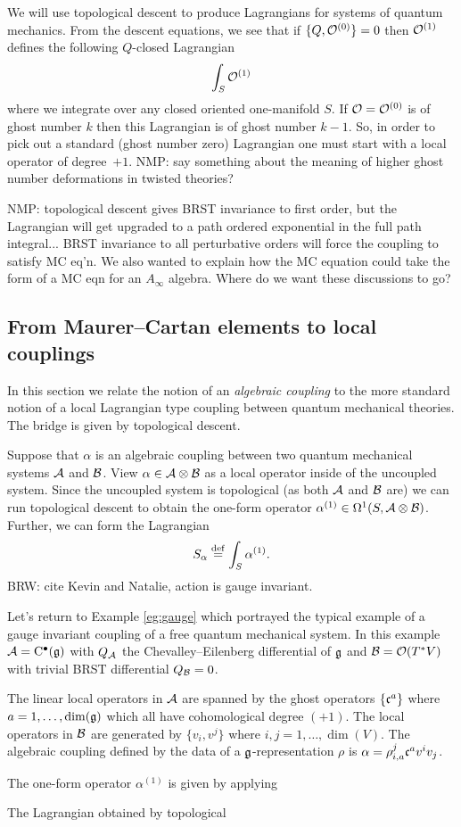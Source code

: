 \documentclass[11pt]{amsart}
\def\brian#1{{\textcolor{blue!65!red}{BRW: {#1}}}}
\def\natalie#1{{\textcolor{green!65!black}{NMP: {#1}}}}
\begin{document}
We will use topological descent to produce Lagrangians for systems of quantum mechanics. 
From the descent equations, we see that if $\{Q,\mathcal O^{(0)}\} = 0$ then $\mathcal O^{(1)}$ defines the following $Q$-closed Lagrangian
\[
\int_S \mathcal O^{(1)} 
\]
where we integrate over any closed oriented one-manifold $S$.
If $\mathcal O = \mathcal O^{(0)}$ is of ghost number $k$ then this Lagrangian is of ghost number $k-1$. 
So, in order to pick out a standard (ghost number zero) Lagrangian one must start with a local operator of degree~$+1$. \natalie{say something about the meaning of higher ghost number deformations in twisted theories?}

\natalie{topological descent gives BRST invariance to first order, but the Lagrangian will get upgraded to a path ordered exponential in the full path integral... BRST invariance to all perturbative orders will force the coupling to satisfy MC eq'n. We also wanted to explain how the MC equation could take the form of a MC eqn for an $A_{\infty}$ algebra. Where do we want these discussions to go?}


\subsection{From Maurer--Cartan elements to local couplings} 

In this section we relate the notion of an {\em algebraic coupling} to the more standard notion of a local Lagrangian type coupling between quantum mechanical theories. 
The bridge is given by topological descent. 

Suppose that $\alpha$ is an algebraic coupling between two quantum mechanical systems $\mathcal A$ and $\mathcal B$. 
View $\alpha \in \mathcal A \otimes \mathcal B$ as a local operator inside of the uncoupled system. 
Since the uncoupled system is topological (as both $\mathcal A$ and $\mathcal B$ are) we can run topological descent to obtain the one-form operator $\alpha^{(1)} \in \Omega^1 (S , \mathcal A \otimes \mathcal B)$.
Further, we can form the Lagrangian 
\[
S_\alpha \overset{\rm def}{=} \int_S \alpha^{(1)} .\]
\brian{cite Kevin and Natalie, action is gauge invariant.}

\begin{eg}
\label{eg:gaugelocal}
Let's return to Example \ref{eg:gauge} which portrayed the typical example of a gauge invariant coupling of a free quantum mechanical system. 
In this example $\mathcal A = {\rm C}^\bullet(\mathfrak g)$ with $Q_{\mathcal A}$ the Chevalley--Eilenberg differential of $\mathfrak g$ and $\mathcal B = \mathcal O(T^* V)$ with trivial BRST differential $Q_{\mathcal B} = 0$. 

The linear local operators in $\mathcal A$ are spanned by the ghost operators $\{\mathfrak c^a\}$ where $a = 1,\ldots, \dim(\mathfrak g)$ which all have cohomological degree $(+1)$. 
The local operators in $\mathcal B$ are generated by $\{v_i, v^j\}$ where $i,j=1,\ldots, \dim(V)$. 
The algebraic coupling defined by the data of a $\mathfrak g$-representation $\rho$ is $\alpha = \rho_{i,a}^j \mathfrak c^a v^i v_j$. 

The one-form operator $\alpha^{(1)}$ is given by applying 

The Lagrangian obtained by topological 
\end{eg}
\end{document}
